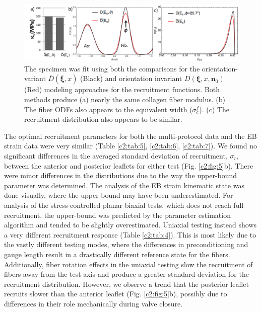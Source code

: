     
\begin{figure}
\centering
\includegraphics[width=\textwidth]{Images/chapter2/figure6.pdf}
\caption{The specimen was fit using both the comparisons for the orientation-variant $\bar{D}(\bar{\mathbf{\xi}},x)$ (Black) and orientation invariant $D(\mathbf{\xi},x,\mathbf{n}_0)$ (Red) modeling approaches for the recruitment functions. Both methods produce (a) nearly the same collagen fiber modulus. (b) The fiber ODFs also appears to the equivalent width ($\sigma_c^f$). (c) The recruitment distribution also appears to be similar.}
\label{c2:fig:6}
\end{figure}
    
    
    The optimal recruitment parameters for both the multi-protocol data and the EB strain data were very similar (Table \ref{c2:tab:5}, \ref{c2:tab:6}, \ref{c2:tab:7}). We found no significant differences in the averaged standard deviation of recruitment, $\sigma_r$, between the anterior and posterior leaflets for either test (Fig. \ref{c2:fig:5}b). There were minor differences in the distributions due to the way the upper-bound parameter was determined. The analysis of the EB strain kinematic state was done visually, where the upper-bound may have been underestimated. For analysis of the stress-controlled planar biaxial tests, which does not reach full recruitment, the upper-bound was predicted by the parameter estimation algorithm and tended to be slightly overestimated. Uniaxial testing instead shows a very different recruitment response (Table \ref{c2:tab:4}). This is most likely due to the vastly different testing modes, where the differences in preconditioning and gauge length result in a drastically different reference state for the fibers. Additionally, fiber rotation effects in the uniaxial testing slow the recruitment of fibers away from the test axis and produce a greater standard deviation for the recruitment distribution. However, we observe a trend that the posterior leaflet recruits slower than the anterior leaflet (Fig. \ref{c2:fig:5}b), possibly due to differences in their role mechanically during valve closure.
    
